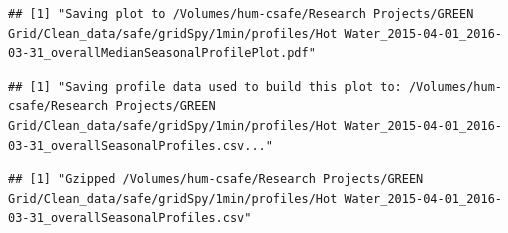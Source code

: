\documentclass[]{article}
\begin{document}
\begin{verbatim}
## [1] "Saving plot to /Volumes/hum-csafe/Research Projects/GREEN Grid/Clean_data/safe/gridSpy/1min/profiles/Hot Water_2015-04-01_2016-03-31_overallMedianSeasonalProfilePlot.pdf"
\end{verbatim}

\begin{verbatim}
## [1] "Saving profile data used to build this plot to: /Volumes/hum-csafe/Research Projects/GREEN Grid/Clean_data/safe/gridSpy/1min/profiles/Hot Water_2015-04-01_2016-03-31_overallSeasonalProfiles.csv..."
\end{verbatim}

\begin{verbatim}
## [1] "Gzipped /Volumes/hum-csafe/Research Projects/GREEN Grid/Clean_data/safe/gridSpy/1min/profiles/Hot Water_2015-04-01_2016-03-31_overallSeasonalProfiles.csv"
\end{verbatim}
\end{document}
